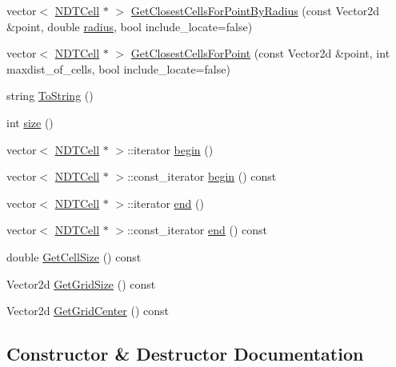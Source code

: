 \begin{DoxyCompactItemize}
\item 
vector$<$ \hyperlink{classNDTCell}{N\+D\+T\+Cell} $\ast$ $>$ \hyperlink{classNDTGrid_ab26b25cf8ccd37ecf99c34fb60f79e90}{Get\+Closest\+Cells\+For\+Point\+By\+Radius} (const Vector2d \&point, double \hyperlink{test__match_8cc_a3f67c53b80389c5f53961936edba04c9}{radius}, bool include\+\_\+locate=false)
\item 
vector$<$ \hyperlink{classNDTCell}{N\+D\+T\+Cell} $\ast$ $>$ \hyperlink{classNDTGrid_a56e989343639b8eafac036f2dee614f6}{Get\+Closest\+Cells\+For\+Point} (const Vector2d \&point, int maxdist\+\_\+of\+\_\+cells, bool include\+\_\+locate=false)
\item 
string \hyperlink{classNDTGrid_a53ab3dca007fddacb4ca09d165eab93d}{To\+String} ()
\item 
int \hyperlink{classNDTGrid_a8a55fc9ac056847baaff928c8cd5f59a}{size} ()
\item 
vector$<$ \hyperlink{classNDTCell}{N\+D\+T\+Cell} $\ast$ $>$\+::iterator \hyperlink{classNDTGrid_a8f7266d28b638b1da7ba4e17e52d6241}{begin} ()
\item 
vector$<$ \hyperlink{classNDTCell}{N\+D\+T\+Cell} $\ast$ $>$\+::const\+\_\+iterator \hyperlink{classNDTGrid_a05cbce8015bf6696fa08a9c9a78961d9}{begin} () const
\item 
vector$<$ \hyperlink{classNDTCell}{N\+D\+T\+Cell} $\ast$ $>$\+::iterator \hyperlink{classNDTGrid_a788db3557af5ce9bfc6917a8a84aec97}{end} ()
\item 
vector$<$ \hyperlink{classNDTCell}{N\+D\+T\+Cell} $\ast$ $>$\+::const\+\_\+iterator \hyperlink{classNDTGrid_a5c83cdcf6fe6ac829c39a05a2a491156}{end} () const
\item 
double \hyperlink{classNDTGrid_ad79296564d68f52f63b103af2145308b}{Get\+Cell\+Size} () const
\item 
Vector2d \hyperlink{classNDTGrid_ac6e8b872b26bbbb154882e4c4db0d417}{Get\+Grid\+Size} () const
\item 
Vector2d \hyperlink{classNDTGrid_ae65d3aa2f34bf0801456df852853950e}{Get\+Grid\+Center} () const
\end{DoxyCompactItemize}


\subsection{Constructor \& Destructor Documentation}
\mbox{\label{classNDTGrid_a3b06177c67f897a783b74b07bf520772}} 
